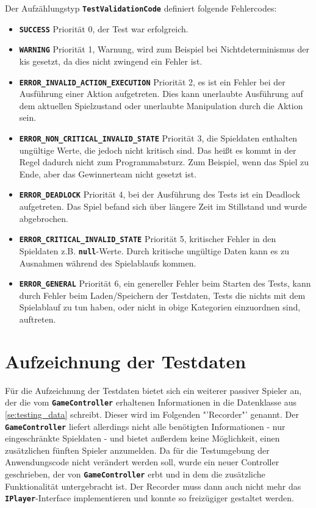 \documentclass[
							a4paper, 
							11pt, 
							openany, 
							liststotoc,
							parskip=half, 
   							headings=normal
						]{scrreprt}
\begin{document}
{Der Aufzählungstyp \textbf{\texttt{TestValidationCode}} definiert folgende Fehlercodes:
\begin{itemize}
	\item \textbf{\texttt{SUCCESS}} Priorität 0, der Test war erfolgreich. 
	\item \textbf{\texttt{WARNING}} Priorität 1, Warnung, wird zum Beispiel bei Nichtdeterminismus der \acs{ki}s gesetzt, da dies nicht zwingend ein Fehler ist.
	\item \textbf{\texttt{ERROR\_INVALID\_ACTION\_EXECUTION}} Priorität 2, es ist ein Fehler bei der Ausführung einer Aktion aufgetreten. Dies kann unerlaubte Ausführung auf dem aktuellen Spielzustand oder unerlaubte Manipulation durch die Aktion sein.
	\item \textbf{\texttt{ERROR\_NON\_CRITICAL\_INVALID\_STATE}} Priorität 3, die Spieldaten enthalten un\-gül\-ti\-ge Werte, die jedoch nicht kritisch sind. Das heißt es kommt in der Regel dadurch nicht zum Programmabsturz. Zum Beispiel, wenn das Spiel zu Ende, aber das Gewinnerteam nicht gesetzt ist.
	\item \textbf{\texttt{ERROR\_DEADLOCK}} Priorität 4, bei der Ausführung des Tests ist ein Deadlock aufgetreten. Das Spiel befand sich über längere Zeit im Stillstand und wurde abgebrochen.
	\item \textbf{\texttt{ERROR\_CRITICAL\_INVALID\_STATE}} Priorität 5, kritischer Fehler in den Spieldaten z.B. \textbf{\texttt{null}}-Werte. Durch kritische ungültige Daten kann es zu Ausnahmen während des Spielablaufs kommen.
	\item \textbf{\texttt{ERROR\_GENERAL}} Priorität 6, ein genereller Fehler beim Starten des Tests, kann durch Fehler beim Laden/Speichern der Testdaten, Tests die nichts mit dem Spielablauf zu tun haben, oder nicht in obige Kategorien einzuordnen sind, auftreten.
\end{itemize}

\clearpage

\section{Aufzeichnung der Testdaten} \label{se:testing_recording}
Für die Aufzeichnung der Testdaten bietet sich ein weiterer passiver Spieler an, der die vom \textbf{\texttt{GameController}} erhaltenen Informationen in die Datenklasse aus \autoref{se:testing_data} schreibt. Dieser wird im Folgenden "'Recorder"' genannt.\newline
Der \textbf{\texttt{GameController}} liefert allerdings nicht alle benötigten Informationen - nur eingeschränkte Spieldaten - und bietet außerdem keine Möglichkeit, einen zusätzlichen fünften Spieler anzumelden.\newline
Da für die Testumgebung der Anwendungscode nicht verändert werden soll, wurde ein neuer Controller geschrieben, der von \textbf{\texttt{GameController}} erbt und in dem die zusätzliche Funktionalität untergebracht ist.\newline
Der Recorder muss dann auch nicht mehr das \textbf{\texttt{IPlayer}}-Interface implementieren und konnte so freizügiger gestaltet werden.
 
}
\end{document}
